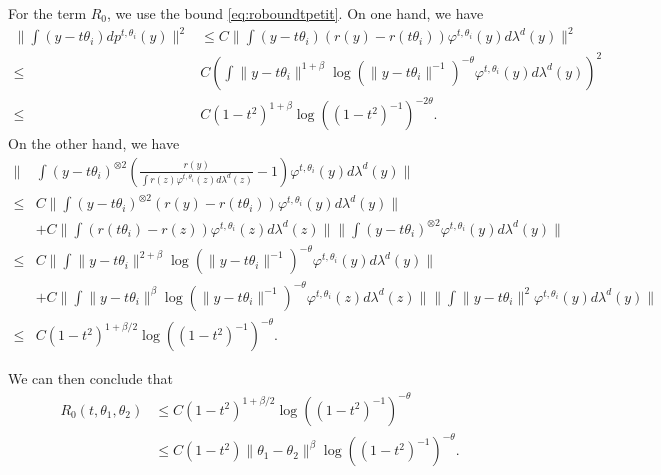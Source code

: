 \documentclass{article}
\begin{document}
For the term $R_0$, we use the bound \eqref{eq:roboundtpetit}. On one hand, we have 
\begin{align*}
\|\int(y-t\theta_i)d p^{t,\theta_i}(y)\|^2 & \leq C\|\int(y-t\theta_i)(r(y)-r(t\theta_i))\varphi^{t,\theta_i}(y)d\lambda^d(y)\|^2\\
     \leq &C \left(\int\|y-t\theta_i\|^{1+\beta}\log(\|y-t\theta_i\|^{-1})^{-\theta}\varphi^{t,\theta_i}(y)d\lambda^d(y)\right)^2\\
     \leq & C(1-t^2)^{1+\beta}\log((1-t^2)^{-1})^{-2\theta}.
\end{align*}
On the other hand, we have 
\begin{align*}
\|&\int\left(y-t\theta_i\right)^{\otimes2}\left( \frac{r(y)}{\int r(z)\varphi^{t,\theta_i}(z)d\lambda^d(z)}-1\right)\varphi^{t,\theta_i}(y)d\lambda^d(y)\|\\
      \leq & C \|\int\left(y-t\theta_i\right)^{\otimes2}\left( r(y)-r(t\theta_i)\right)\varphi^{t,\theta_i}(y)d\lambda^d(y)\|\nonumber\\
      & + C \| \int (r(t\theta_i)-r(z))\varphi^{t,\theta_i}(z)d\lambda^d(z)\| \|\int\left(y-t\theta_i\right)^{\otimes2}\varphi^{t,\theta_i}(y)d\lambda^d(y)\|
      \nonumber\\
    \leq & C \|\int\|y-t\theta_i\|^{2+\beta}\log(\|y-t\theta_i\|^{-1})^{-\theta}\varphi^{t,\theta_i}(y)d\lambda^d(y)\|\\
    & +C\| \int \|y-t\theta_i\|^\beta\log(\|y-t\theta_i\|^{-1})^{-\theta}\varphi^{t,\theta_i}(z)d\lambda^d(z)\| \|\int\|y-t\theta_i\|^2\varphi^{t,\theta_i}(y)d\lambda^d(y)\|\\
    \leq & C(1-t^2)^{1+\beta/2}\log((1-t^2)^{-1})^{-\theta}.
\end{align*}

We can then conclude that
\begin{align}\label{align:r0boundreu}
R_0(t,\theta_1,\theta_2)&\leq C(1-t^2)^{1+\beta/2}\log((1-t^2)^{-1})^{-\theta}\\
    & \leq C(1-t^2)\|\theta_1-\theta_2\|^{\beta}\log((1-t^2)^{-1})^{-\theta}\nonumber.
\end{align}
\end{document}
